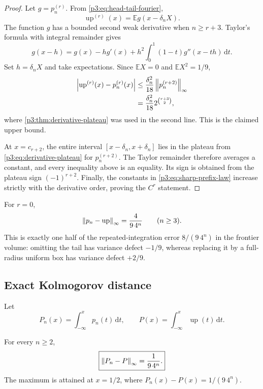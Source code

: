 \documentclass[11pt,oneside]{article}
\numberwithin{equation}{section}
\theoremstyle{definition}
\theoremstyle{remark}
\newcommand{\E}{\mathbb E}
\newcommand{\Up}{\operatorname{up}}
\newcommand{\dd}{\,\mathrm d}
\begin{document}
\begin{proof}
Let $g=p_n^{(r)}$.  From \cref{p3:eq:head-tail-fourier},
\[
 \Up^{(r)}(x)=\E g(x-\delta_nX).
\]
The function $g$ has a bounded second weak derivative when $n\ge r+3$.
Taylor's formula with integral remainder gives
\[
 g(x-h)=g(x)-hg'(x)+h^2\int_0^1(1-t)g''(x-th)\dd t.
\]
Set $h=\delta_nX$ and take expectations.  Since $\E X=0$ and $\E X^2=1/9$,
\begin{align*}
 \abs{\Up^{(r)}(x)-p_n^{(r)}(x)}
 &\le\frac{\delta_n^2}{18}\norm{p_n^{(r+2)}}_\infty\\
 &=\frac{\delta_n^2}{18}2^{\binom{r+3}{2}},
\end{align*}
where \cref{p3:thm:derivative-plateau} was used in the second line.  This is the claimed
upper bound.

At $x=c_{r+2}$, the entire interval
$[x-\delta_n,x+\delta_n]$ lies in the plateau from
\cref{p3:eq:derivative-plateau} for $p_n^{(r+2)}$.  The Taylor remainder therefore
averages a constant, and every inequality above is an equality.  Its sign is obtained
from the plateau sign $(-1)^{r+2}$.  Finally, the constants in
\cref{p3:eq:sharp-prefix-law} increase strictly with the derivative order, proving the
$C^r$ statement.
\end{proof}

For $r=0$,
\begin{equation}
 \norm{p_n-\Up}_\infty=\frac{4}{9\,4^n}
 \qquad(n\ge3).
 \label{p3:eq:sharp-uniform-r0}
\end{equation}
This is exactly one half of the repeated-integration error
$8/(9\,4^n)$ in the frontier volume: omitting the tail has variance defect $-1/9$,
whereas replacing it by a full-radius uniform box has variance defect $+2/9$.

\subsection{Exact Kolmogorov distance}

Let
\begin{equation}
 P_n(x)=\int_{-\infty}^x p_n(t)\dd t,
 \qquad
 P(x)=\int_{-\infty}^x\Up(t)\dd t.
 \label{p3:eq:cdfs}
\end{equation}

\begin{corollary}
\label{p3:cor:kolmogorov}
For every $n\ge2$,
\begin{equation}
 \boxed{
 \left\lVert P_n-P\right\rVert_\infty=\frac{1}{9\,4^n}.}
 \label{p3:eq:kolmogorov}
\end{equation}
The maximum is attained at $x=1/2$, where $P_n(x)-P(x)=1/(9\,4^n)$.
\end{corollary}
\end{document}
